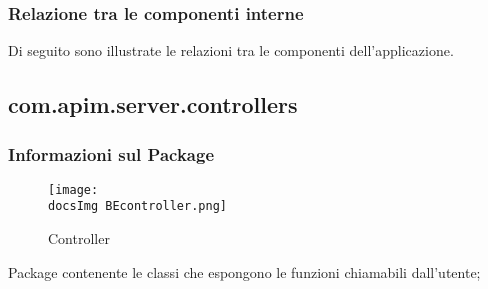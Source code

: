 {{        \subsubsection{Relazione tra le componenti interne}
        Di seguito sono illustrate le relazioni tra le componenti dell'applicazione.
  }
  \subsection{com.apim.server.controllers}{
    \subsubsection{Informazioni sul Package}
        \begin{figure}[H]
          \centering
          \texttt{[image: \\docsImg BEcontroller.png]}
          \caption{Controller}
          \label{Controller}
        \end{figure}
        Package contenente le classi che espongono le funzioni  chiamabili dall'utente;
}}
